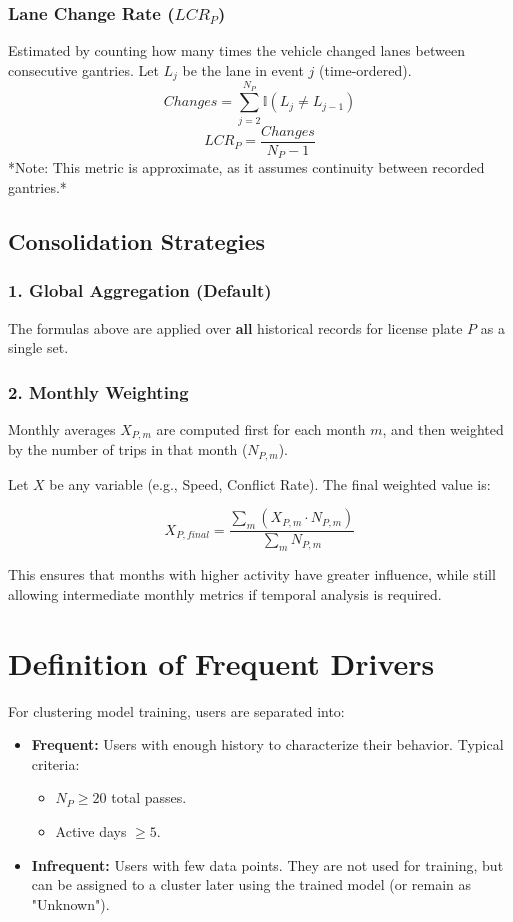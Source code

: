 \subsubsection{Lane Change Rate ($LCR_P$)}
Estimated by counting how many times the vehicle changed lanes between consecutive gantries. Let $L_j$ be the lane in event $j$ (time-ordered).
\begin{equation}
    Changes = \sum_{j=2}^{N_P} \mathbb{I}(L_j \neq L_{j-1})
\end{equation}
\begin{equation}
    LCR_P = \frac{Changes}{N_P - 1}    
\end{equation}
*Note: This metric is approximate, as it assumes continuity between recorded gantries.*

\subsection{Consolidation Strategies}

\subsubsection{1. Global Aggregation (Default)}
The formulas above are applied over \textbf{all} historical records for license plate $P$ as a single set.

\subsubsection{2. Monthly Weighting}
Monthly averages $X_{P, m}$ are computed first for each month $m$, and then weighted by the number of trips in that month ($N_{P, m}$).

Let $X$ be any variable (e.g., Speed, Conflict Rate). The final weighted value is:

\begin{equation}
    X_{P, final} = \frac{\sum_{m} \left( X_{P, m} \cdot N_{P, m} \right)}{\sum_{m} N_{P, m}}
\end{equation}

This ensures that months with higher activity have greater influence, while still allowing intermediate monthly metrics if temporal analysis is required.

\section{Definition of Frequent Drivers}
For clustering model training, users are separated into:
\begin{itemize}
    \item \textbf{Frequent:} Users with enough history to characterize their behavior. Typical criteria:
    \begin{itemize}
        \item $N_P \ge 20$ total passes.
        \item Active days $\ge 5$.
    \end{itemize}
    \item \textbf{Infrequent:} Users with few data points. They are not used for training, but can be assigned to a cluster later using the trained model (or remain as "Unknown").
\end{itemize}

